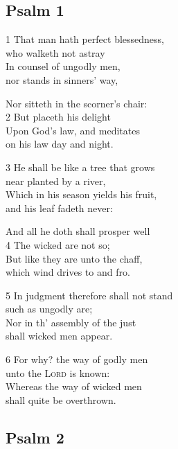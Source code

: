 \subsection*{Psalm 1 }


1 That man hath perfect blessedness,\\
who walketh not astray\\
In counsel of ungodly men,\\
nor stands in sinners’ way,

Nor sitteth in the scorner’s chair:\\
2 But placeth his delight\\
Upon God’s law, and meditates\\
on his law day and night.

3 He shall be like a tree that grows\\
near planted by a river,\\
Which in his season yields his fruit,\\
and his leaf fadeth never:

And all he doth shall prosper well\\
4 The wicked are not so;\\
But like they are unto the chaff,\\
which wind drives to and fro.

5 In judgment therefore shall not stand \\
such as ungodly are; \\
Nor in th’ assembly of the just \\
shall wicked men appear.

6 For why? the way of godly men \\
unto the \textsc{Lord} is known:\\
Whereas the way of wicked men \\
shall quite be overthrown.

\begin{center}
\quad{}\quad{}
\end{center}

\subsection*{Psalm 2 }

